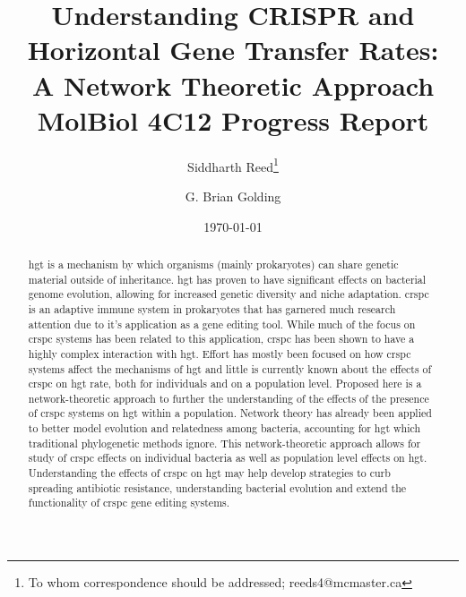 \documentclass[12pt,letter]{article}
\begin{document}
\title{Understanding CRISPR and Horizontal Gene Transfer Rates:\\\vspace{0.2cm}
        A Network Theoretic Approach\\ \vspace{0.5cm}
       \Large MolBiol 4C12 Progress Report}
\author[1]{Siddharth Reed\thanks{To whom correspondence should be addressed; reeds4@mcmaster.ca}}
\author[1]{G. Brian Golding\vspace{-0.45cm}}
\date{\today}
\maketitle
\begin{abstract}
    \ac{hgt} is a mechanism by which organisms (mainly prokaryotes) can share genetic material outside of inheritance.
    \ac{hgt} has proven to have significant effects on bacterial genome evolution, allowing for increased genetic diversity and niche adaptation.
    \ac{crspc} is an adaptive immune system in prokaryotes that has garnered much research attention due to it's application as a gene editing tool.
    While much of the focus on \ac{crspc} systems has been related to this application, \ac{crspc} has been shown to have a highly complex interaction with \ac{hgt}.
    Effort has mostly been focused on how \ac{crspc} systems affect the mechanisms of \ac{hgt} and little is currently known about the effects of \ac{crspc} on \ac{hgt} rate, both for individuals and on a population level.
    Proposed here is a network-theoretic approach to further the understanding of the effects of the presence of \ac{crspc} systems on \ac{hgt} within a population.
    Network theory has already been applied to better model evolution and relatedness among bacteria, accounting for \ac{hgt} which traditional phylogenetic methods ignore.
    This network-theoretic approach allows for study of \ac{crspc} effects on individual bacteria as well as population level effects on \ac{hgt}.
    Understanding the effects of \ac{crspc} on \ac{hgt} may help develop strategies to curb spreading antibiotic resistance, understanding bacterial evolution and extend the functionality of \ac{crspc} gene editing systems.
\end{abstract}
\newpage
\linespread{1.25}%
\end{document}
